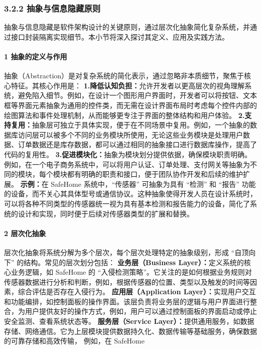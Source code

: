 \subsubsection{3.2.2 抽象与信息隐藏原则}\label{ux62bdux8c61ux4e0eux4fe1ux606fux9690ux85cfux539fux5219}
抽象与信息隐藏是软件架构设计的关键原则，通过层次化抽象简化复杂系统，并通过接口封装隔离实现细节。本小节将深入探讨其定义、应用及实践方法。 \paragraph{1
抽象的定义与作用}\label{ux62bdux8c61ux7684ux5b9aux4e49ux4e0eux4f5cux7528} 抽象（Abstraction）是对复杂系统的简化表示，通过忽略非本质细节，聚焦于核心特征。其核心作用是：
\textbf{1.降低认知负担：}允许开发者以更高层次的视角理解系统，避免陷入细节。例如，在设计一个图形用户界面时，开发者可以将按钮、文本框等界面元素抽象为通用的控件类，而无需在设计界面布局时考虑每个控件内部的绘图算法和事件处理机制，从而能够更专注于界面的整体结构和用户体验。
\textbf{2.支持复用：}抽象层可独立于具体实现，便于在不同场景中复用。例如，一个抽象的数据库访问层可以被多个不同的业务模块所使用，无论这些业务模块是处理用户数据、订单数据还是库存数据，都可以通过相同的抽象接口进行数据库操作，提高了代码的复用性。
\textbf{3.促进模块化：}抽象为模块划分提供依据，确保模块职责明确。例如，在一个电子商务系统中，可以将用户认证、订单处理、支付网关等抽象为不同的模块，每个模块都有明确的职责和接口，便于团队协作开发和后续的维护扩展。
\textbf{示例：}在 SafeHome 系统中，``传感器'' 可抽象为具有 ``检测'' 和 ``报告''
功能的设备，而不关心其具体型号或通信协议。这种抽象使得开发人员在设计系统时，可以将各种不同类型的传感器统一视为具有基本检测和报告能力的设备，简化了系统的设计和实现，同时便于后续对传感器类型的扩展和替换。 \paragraph{2
层次化抽象}\label{ux5c42ux6b21ux5316ux62bdux8c61} 层次化抽象将系统分解为多个层次，每个层次处理特定的抽象级别，形成 ``自顶向下'' 的结构。常见的层次划分包括：
\textbf{业务层（Business Layer）：}定义系统的核心业务逻辑，如 SafeHome 的
``入侵检测策略''。它关注的是如何根据业务规则对传感器数据进行分析和判断，例如，根据传感器的位置、类型以及触发的时间等因素，综合评估是否存在入侵行为。 \textbf{应用层（Application
Layer）：}实现用户交互和功能编排，如控制面板的操作界面。该层负责将业务层的逻辑与用户界面进行整合，为用户提供友好的操作方式，例如，用户可以通过控制面板的界面启动或停止安全监测、查看系统状态等。 \textbf{服务层（Service
Layer）：}提供通用服务，如数据存储、网络通信。它为上层模块提供数据持久化、数据传输等基础服务，确保数据的可靠存储和高效传输， 例如，在 SafeHome
